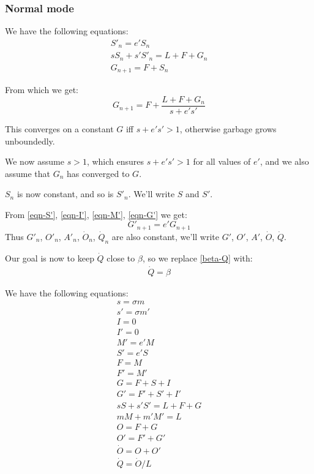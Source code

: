 \documentclass{article}
\begin{document}
\subsubsection{Normal mode}

We have the following equations:
\begin{gather*}
S'_n = e'S_n \\
sS_n + s'S'_n = L + F + G_n \\
G_{n+1} = F + S_n
\end{gather*}

From which we get:
\begin{equation}
G_{n+1} = F + \frac{L + F + G_n}{s + e's'}
\end{equation}

This converges on a constant $G$ iff $s + e's' > 1$,
otherwise garbage grows unboundedly.

We now assume $s > 1$, which ensures $s + e's' > 1$ for all values of
$e'$, and we also assume that $G_n$ has converged to $G$.

$S_n$ is now constant, and so is $S'_n$. We'll write $S$ and $S'$.

From \eqref{eqn-S'}, \eqref{eqn-I'}, \eqref{eqn-M'}, \eqref{eqn-G'} we get:
\begin{equation}
G'_{n+1} = e' G_{n+1}
\end{equation}
Thus $G'_n$, $O'_n$, $A'_n$, $\dot{O}_n$, $\dot{Q}_n$ are
also constant, we'll write $G'$, $O'$, $A'$, $\dot{O}$,
$\dot{Q}$.

Our goal is now to keep $\dot{Q}$ close to $\beta$, so we replace
\eqref{beta-Q} with:
\begin{gather}
\dot{Q} = \beta \label{beta-Qbar}
\end{gather}

We have the following equations:
\begin{gather*}
 s = \sigma m \\
 s' = \sigma m'\\
 I = 0 \\
 I' = 0 \\
 M' = e' M \\
 S' = e' S \\
 F = M \\
 F' = M' \\
 G = F + S + I \\
 G' = F' + S' + I' \\
 sS + s'S' = L + F + G \\
 mM + m'M' = L \\
 O = F + G \\
 O' = F' + G' \\
 \dot{O} = O + O' \\
 \dot{Q} = \dot{O} / L \\
\end{gather*}
\end{document}
